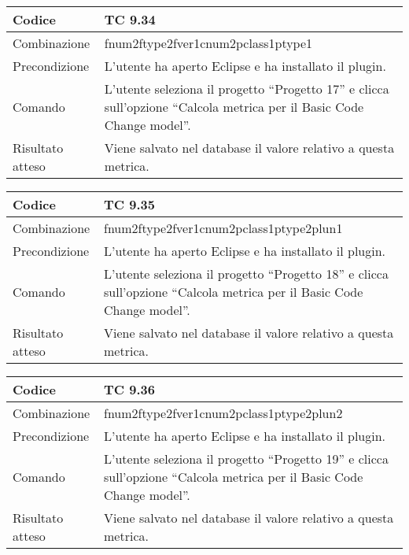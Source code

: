 \clearpage

\begin{table}[ht]
\begin{tabular}{|p{3cm}|p{9cm}|}
\hline
\cellcolor{lightgray}Codice				& TC 9.34								\\
\hline
\cellcolor{lightgray}Combinazione		& fnum2ftype2fver1cnum2pclass1ptype1									\\
\hline
\cellcolor{lightgray}Precondizione		& L'utente ha aperto Eclipse e ha installato il plugin.		\\
\hline
\cellcolor{lightgray}Comando			& L'utente seleziona il progetto ``Progetto 17''  e clicca sull'opzione ``Calcola metrica per il Basic Code Change model''.	\\
\hline
\cellcolor{lightgray}Risultato atteso	& Viene salvato nel database il valore relativo a questa metrica.\\
\hline
\end{tabular}
\end{table}

\begin{table}[ht]
\begin{tabular}{|p{3cm}|p{9cm}|}
\hline
\cellcolor{lightgray}Codice				& TC 9.35								\\
\hline
\cellcolor{lightgray}Combinazione		& fnum2ftype2fver1cnum2pclass1ptype2plun1									\\
\hline
\cellcolor{lightgray}Precondizione		& L'utente ha aperto Eclipse e ha installato il plugin.		\\
\hline
\cellcolor{lightgray}Comando			& L'utente seleziona il progetto ``Progetto 18''  e clicca sull'opzione ``Calcola metrica per il Basic Code Change model''.	\\
\hline
\cellcolor{lightgray}Risultato atteso	& Viene salvato nel database il valore relativo a questa metrica.\\
\hline
\end{tabular}
\end{table}

\begin{table}[ht]
\begin{tabular}{|p{3cm}|p{9cm}|}
\hline
\cellcolor{lightgray}Codice				& TC 9.36								\\
\hline
\cellcolor{lightgray}Combinazione		& fnum2ftype2fver1cnum2pclass1ptype2plun2									\\
\hline
\cellcolor{lightgray}Precondizione		& L'utente ha aperto Eclipse e ha installato il plugin.		\\
\hline
\cellcolor{lightgray}Comando			& L'utente seleziona il progetto ``Progetto 19''  e clicca sull'opzione ``Calcola metrica per il Basic Code Change model''.	\\
\hline
\cellcolor{lightgray}Risultato atteso	& Viene salvato nel database il valore relativo a questa metrica.\\
\hline
\end{tabular}
\end{table}

